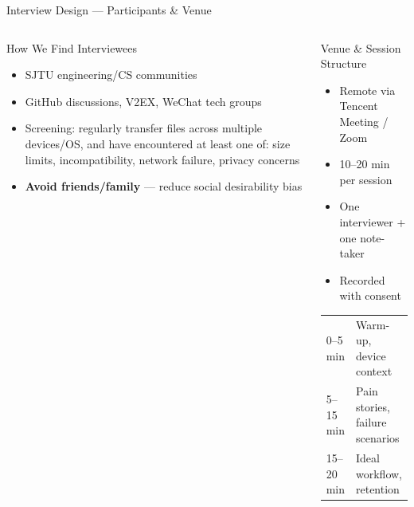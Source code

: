 \documentclass[xcolor=table,dvipsnames,svgnames,aspectratio=169]{beamer}
\begin{document}

\appendix

\begin{frame}[shrink=8]{Interview Design --- Participants \& Venue}
  \begin{columns}[t]
    \begin{block}{How We Find Interviewees}
      \begin{itemize}
        \item SJTU engineering/CS communities
        \item GitHub discussions, V2EX, WeChat tech groups
        \item Screening: regularly transfer files across multiple devices/OS, and have encountered at least one of: size limits, incompatibility, network failure, privacy concerns
        \item \textbf{Avoid friends/family} --- reduce social desirability bias
      \end{itemize}
    \end{block}
    \begin{block}{Venue \& Session Structure}
      \begin{itemize}
        \item Remote via Tencent Meeting / Zoom
        \item 10--20 min per session
        \item One interviewer + one note-taker
        \item Recorded with consent
      \end{itemize}
      \vspace{0.5em}
      \begin{tabular}{ll}
        0--5 min  & Warm-up, device context \\
        5--15 min & Pain stories, failure scenarios \\
        15--20 min & Ideal workflow, retention \\
      \end{tabular}
    \end{block}
  \end{columns}
\end{frame}
\end{document}
